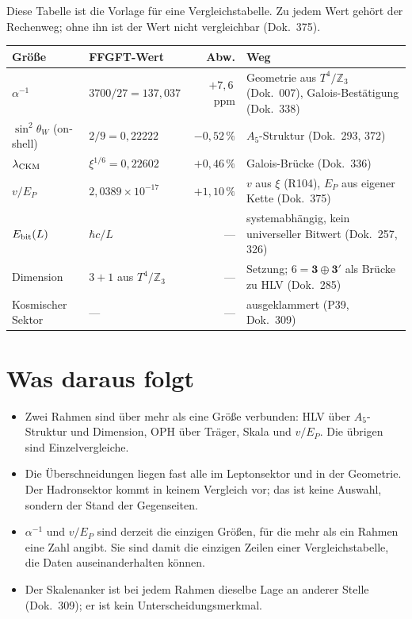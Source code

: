 Diese Tabelle ist die Vorlage für eine Vergleichstabelle. Zu jedem Wert gehört
der Rechenweg; ohne ihn ist der Wert nicht vergleichbar (Dok.~375).

\begin{center}
\small
\begin{tabular}{@{}llrl@{}}
\toprule
\textbf{Größe} & \textbf{FFGFT-Wert} & \textbf{Abw.} & \textbf{Weg} \\
\midrule
$\alpha^{-1}$ & $3700/27=137{,}037$ & $+7{,}6$\,ppm &
  Geometrie aus $T^4/\mathbb{Z}_3$ (Dok.~007), Galois-Bestätigung (Dok.~338) \\
$\sin^2\theta_W$ (on-shell) & $2/9=0{,}22222$ & $-0{,}52\,\%$ &
  $A_5$-Struktur (Dok.~293, 372) \\
$\lambda_{\rm CKM}$ & $\xi^{1/6}=0{,}22602$ & $+0{,}46\,\%$ &
  Galois-Brücke (Dok.~336) \\
$v/E_P$ & $2{,}0389\times10^{-17}$ & $+1{,}10\,\%$ &
  $v$ aus $\xi$ (R104), $E_P$ aus eigener Kette (Dok.~375) \\
$E_{\rm bit}(L)$ & $\hbar c/L$ & --- &
  systemabhängig, kein universeller Bitwert (Dok.~257, 326) \\
Dimension & $3{+}1$ aus $T^4/\mathbb{Z}_3$ & --- &
  Setzung; $6=\mathbf{3}\oplus\mathbf{3'}$ als Brücke zu HLV (Dok.~285) \\
Kosmischer Sektor & --- & --- &
  ausgeklammert (P39, Dok.~309) \\
\bottomrule
\end{tabular}
\end{center}

\section{Was daraus folgt}

\begin{itemize}\itemsep2pt
\item Zwei Rahmen sind über mehr als eine Größe verbunden: HLV über
  $A_5$-Struktur und Dimension, OPH über Träger, Skala und $v/E_P$. Die
  übrigen sind Einzelvergleiche.
\item Die Überschneidungen liegen fast alle im Leptonsektor und in der
  Geometrie. Der Hadronsektor kommt in keinem Vergleich vor; das ist keine
  Auswahl, sondern der Stand der Gegenseiten.
\item $\alpha^{-1}$ und $v/E_P$ sind derzeit die einzigen Größen, für die
  mehr als ein Rahmen eine Zahl angibt. Sie sind damit die einzigen Zeilen
  einer Vergleichstabelle, die Daten auseinanderhalten können.
\item Der Skalenanker ist bei jedem Rahmen dieselbe Lage an anderer Stelle
  (Dok.~309); er ist kein Unterscheidungsmerkmal.
\end{itemize}

